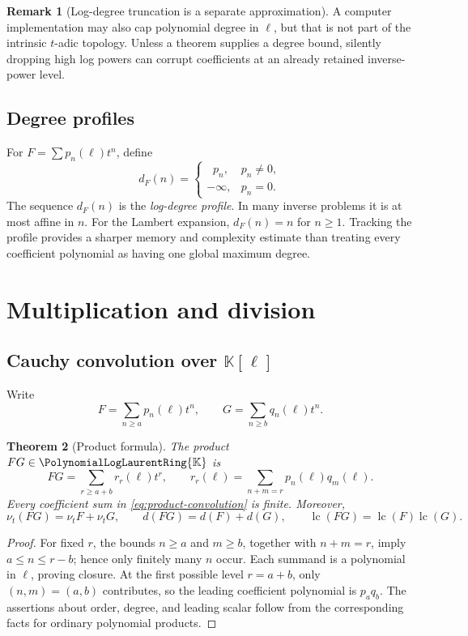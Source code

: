\documentclass[11pt,oneside]{article}
\numberwithin{equation}{section}
\newtheorem{theorem}{Theorem}[section]
\theoremstyle{definition}
\newtheorem{remark}[theorem]{Remark}
\newcommand{\K}{\mathbb{K}}
\newcommand{\PL}{\PolynomialLogLaurentRing{\K}}
\newcommand{\ordx}{\nu_t}
\newcommand{\lc}{\operatorname{lc}}
\DeclareMathOperator{\degell}{deg_{\ell}}
\begin{document}
\begin{remark}[Log-degree truncation is a separate approximation]
A computer implementation may also cap polynomial degree in \(\ell\), but that
is not part of the intrinsic \(t\)-adic topology.  Unless a theorem supplies a
degree bound, silently dropping high log powers can corrupt coefficients at an
already retained inverse-power level.
\end{remark}

\subsection{Degree profiles}

For \(F=\sum p_n(\ell)t^n\), define
\[
  d_F(n)=\begin{cases}\degell p_n,&p_n\ne0,\\-\infty,&p_n=0.\end{cases}
\]
The sequence \(d_F(n)\) is the \emph{log-degree profile}.  In many inverse
problems it is at most affine in \(n\).  For the Lambert expansion,
\(d_F(n)=n\) for \(n\ge1\).  Tracking the profile provides a sharper memory and
complexity estimate than treating every coefficient polynomial as having one
global maximum degree.

\section{Multiplication and division}\label{sec:mul-div}

\subsection{Cauchy convolution over \(\K[\ell]\)}

Write
\[
  F=\sum_{n\ge a}p_n(\ell)t^n,
  \qquad G=\sum_{n\ge b}q_n(\ell)t^n.
\]

\begin{theorem}[Product formula]\label{thm:product}
The product \(FG\in\PL\) is
\begin{equation}\label{eq:product-convolution}
  FG=\sum_{r\ge a+b}r_r(\ell)t^r,
  \qquad
  r_r(\ell)=\sum_{n+m=r}p_n(\ell)q_m(\ell).
\end{equation}
Every coefficient sum in \eqref{eq:product-convolution} is finite.  Moreover,
\[
  \ordx(FG)=\ordx F+\ordx G,
  \qquad d(FG)=d(F)+d(G),
  \qquad \lc(FG)=\lc(F)\lc(G).
\]
\end{theorem}

\begin{proof}
For fixed \(r\), the bounds \(n\ge a\) and \(m\ge b\), together with
\(n+m=r\), imply \(a\le n\le r-b\); hence only finitely many \(n\) occur.
Each summand is a polynomial in \(\ell\), proving closure.  At the first possible
level \(r=a+b\), only \((n,m)=(a,b)\) contributes, so the leading coefficient
polynomial is \(p_aq_b\).  The assertions about order, degree, and leading
scalar follow from the corresponding facts for ordinary polynomial products.
\end{proof}
\end{document}
